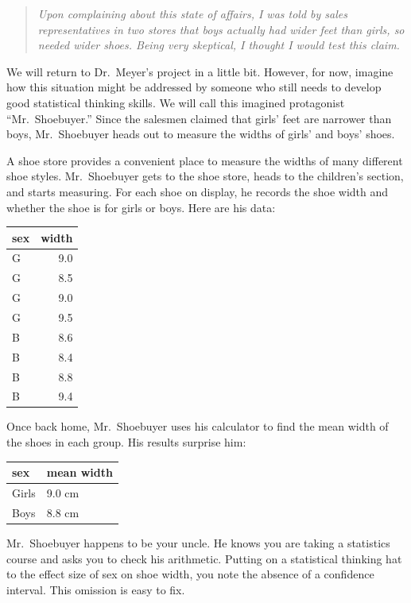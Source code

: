 \documentclass[
  letterpaper,
  DIV=11,
  numbers=noendperiod,
  oneside]{scrreprt}
\begin{document}
\begin{quote}
\emph{Upon complaining about this state of affairs, I was told by sales
representatives in two stores that boys actually had wider feet than
girls, so needed wider shoes. Being very skeptical, I thought I would
test this claim.}
\end{quote}

We will return to Dr.~Meyer's project in a little bit. However, for now,
imagine how this situation might be addressed by someone who still needs
to develop good statistical thinking skills. We will call this imagined
protagonist ``Mr.~Shoebuyer.'' Since the salesmen claimed that girls'
feet are narrower than boys, Mr.~Shoebuyer heads out to measure the
widths of girls' and boys' shoes.

A shoe store provides a convenient place to measure the widths of many
different shoe styles. Mr.~Shoebuyer gets to the shoe store, heads to
the children's section, and starts measuring. For each shoe on display,
he records the shoe width and whether the shoe is for girls or boys.
Here are his data:

\begin{tabular}{l|r}
\hline
sex & width\\
\hline
G & 9.0\\
\hline
G & 8.5\\
\hline
G & 9.0\\
\hline
G & 9.5\\
\hline
B & 8.6\\
\hline
B & 8.4\\
\hline
B & 8.8\\
\hline
B & 9.4\\
\hline
\end{tabular}

Once back home, Mr.~Shoebuyer uses his calculator to find the mean width
of the shoes in each group. His results surprise him:

\begin{longtable}[]{@{}ll@{}}
\toprule()
sex & mean width \\
\midrule()
\endhead
Girls & 9.0 cm \\
Boys & 8.8 cm \\
\bottomrule()
\end{longtable}

Mr.~Shoebuyer happens to be your uncle. He knows you are taking a
statistics course and asks you to check his arithmetic. Putting on a
statistical thinking hat to the effect size of sex on shoe width, you
note the absence of a confidence interval. This omission is easy to fix.
\end{document}
